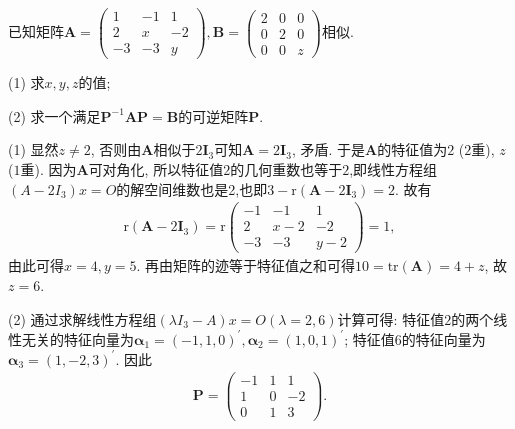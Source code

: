 \documentclass[../../main.tex]{subfiles}
\begin{document}
\begin{example}
已知矩阵\(\boldsymbol{A}=\begin{pmatrix}
1&-1&1\\
2&x&-2\\
-3&-3&y
\end{pmatrix},\boldsymbol{B}=\begin{pmatrix}
2&0&0\\
0&2&0\\
0&0&z
\end{pmatrix}\)相似.

(1) 求\(x,y,z\)的值;

(2) 求一个满足\(\boldsymbol{P}^{-1}\boldsymbol{AP}=\boldsymbol{B}\)的可逆矩阵\(\boldsymbol{P}\). 
\end{example}
\begin{solution}
(1) 显然\(z\neq 2\), 否则由\(\boldsymbol{A}\)相似于\(2\boldsymbol{I}_{3}\)可知\(\boldsymbol{A}=2\boldsymbol{I}_{3}\), 矛盾. 于是\(\boldsymbol{A}\)的特征值为\(2\) (\(2\)重), \(z\) (\(1\)重). 因为\(\boldsymbol{A}\)可对角化, 所以特征值\(2\)的几何重数也等于\(2\),即线性方程组$(A-2I_3)x=O$的解空间维数也是2,也即$3-\mathrm{r}(\boldsymbol{A}-2\boldsymbol{I}_{3})=2$. 故有
\begin{align*}
\mathrm{r}(\boldsymbol{A}-2\boldsymbol{I}_{3})=\mathrm{r}\begin{pmatrix}
-1&-1&1\\
2&x - 2&-2\\
-3&-3&y - 2
\end{pmatrix}=1,
\end{align*}
由此可得\(x = 4,y = 5\). 再由矩阵的迹等于特征值之和可得\(10=\mathrm{tr}(\boldsymbol{A})=4 + z\), 故\(z = 6\).

(2) 通过求解线性方程组$(\lambda I_3-A)x=O(\lambda=2,6)$计算可得: 特征值\(2\)的两个线性无关的特征向量为\(\boldsymbol{\alpha}_{1}=(-1,1,0)^{\prime},\boldsymbol{\alpha}_{2}=(1,0,1)^{\prime}\); 特征值\(6\)的特征向量为\(\boldsymbol{\alpha}_{3}=(1,-2,3)^{\prime}\). 因此
\begin{align*}
\boldsymbol{P}=\begin{pmatrix}
-1&1&1\\
1&0&-2\\
0&1&3
\end{pmatrix}. 
\end{align*}

\end{solution}
\end{document}
